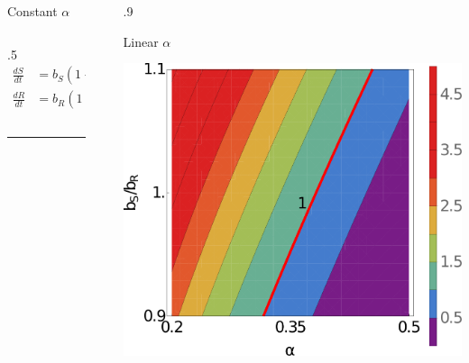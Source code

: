 \documentclass[final]{beamer}
\newlength{\sepwid}
\newlength{\onecolwid}
\newlength{\figwid}
\begin{document}
\begin{frame}[t]
\begin{block}
\begin{columns}[t]
\begin{column}{\onecolwid}
\begin{block}{Constant $\alpha$}
\begin{columns}[t]
\begin{column}{.5\onecolwid}
      \begin{align*}
        \frac{dS}{dt}& = b_S \left(1 - \frac{S + R}{K}\right)S - \alpha S \\[0.5ex]
        \frac{dR}{dt}& = b_R \left(1 - \frac{S + R}{K}\right)R + \alpha S - \delta R
      \end{align*}

      \vspace{2.5\baselineskip}
      \vspace{1ex}
    \end{column}
  \end{columns}
  \hrule height 3pt
  \end{block}
\end{column}

\vrule width 5pt
\begin{column}{\sepwid}\end{column} %

\begin{column}{.9\onecolwid}

  \begin{block}{Linear $\alpha$}
    \begin{center}
      \includegraphics[width=\figwid]{../dev/graphics/poster/linear_contour.pdf}
      \vspace{1.5ex}


\end{center}
\end{block}
\end{column}
\end{columns}
\end{block}
\end{frame}
\end{document}
